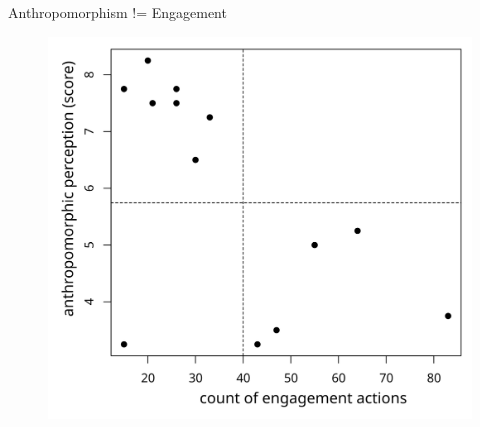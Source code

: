 \documentclass[handout,compress]{beamer}
\begin{document}
\begin{frame}{Anthropomorphism != Engagement}

\begin{figure}
    \hspace*{5cm}\includegraphics[width=0.6\linewidth]{ranger/domino-correlation}
\end{figure}
\end{frame}

\end{document}
